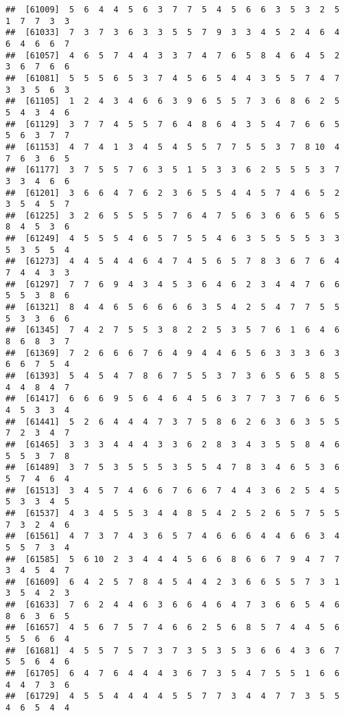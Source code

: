 \documentclass[
]{book}
\begin{document}
\begin{verbatim}
##  [61009]  5  6  4  4  5  6  3  7  7  5  4  5  6  6  3  5  3  2  5  1  7  7  3  3
##  [61033]  7  3  7  3  6  3  3  5  5  7  9  3  3  4  5  2  4  6  4  6  4  6  6  7
##  [61057]  4  6  5  7  4  4  3  3  7  4  7  6  5  8  4  6  4  5  2  3  6  7  6  6
##  [61081]  5  5  5  6  5  3  7  4  5  6  5  4  4  3  5  5  7  4  7  3  3  5  6  3
##  [61105]  1  2  4  3  4  6  6  3  9  6  5  5  7  3  6  8  6  2  5  5  4  3  4  6
##  [61129]  3  7  7  4  5  5  7  6  4  8  6  4  3  5  4  7  6  6  5  5  6  3  7  7
##  [61153]  4  7  4  1  3  4  5  4  5  5  7  7  5  5  3  7  8 10  4  7  6  3  6  5
##  [61177]  3  7  5  5  7  6  3  5  1  5  3  3  6  2  5  5  5  3  7  3  3  4  6  6
##  [61201]  3  6  6  4  7  6  2  3  6  5  5  4  4  5  7  4  6  5  2  3  5  4  5  7
##  [61225]  3  2  6  5  5  5  5  7  6  4  7  5  6  3  6  6  5  6  5  8  4  5  3  6
##  [61249]  4  5  5  5  4  6  5  7  5  5  4  6  3  5  5  5  5  3  3  5  3  5  5  4
##  [61273]  4  4  5  4  4  6  4  7  4  5  6  5  7  8  3  6  7  6  4  7  4  4  3  3
##  [61297]  7  7  6  9  4  3  4  5  3  6  4  6  2  3  4  4  7  6  6  5  5  3  8  6
##  [61321]  8  4  4  6  5  6  6  6  6  3  5  4  2  5  4  7  7  5  5  5  3  3  6  6
##  [61345]  7  4  2  7  5  5  3  8  2  2  5  3  5  7  6  1  6  4  6  8  6  8  3  7
##  [61369]  7  2  6  6  6  7  6  4  9  4  4  6  5  6  3  3  3  6  3  6  6  7  5  4
##  [61393]  5  4  5  4  7  8  6  7  5  5  3  7  3  6  5  6  5  8  5  4  4  8  4  7
##  [61417]  6  6  6  9  5  6  4  6  4  5  6  3  7  7  3  7  6  6  5  4  5  3  3  4
##  [61441]  5  2  6  4  4  4  7  3  7  5  8  6  2  6  3  6  3  5  5  7  2  3  4  7
##  [61465]  3  3  3  4  4  4  3  3  6  2  8  3  4  3  5  5  8  4  6  5  5  3  7  8
##  [61489]  3  7  5  3  5  5  5  3  5  5  4  7  8  3  4  6  5  3  6  5  7  4  6  4
##  [61513]  3  4  5  7  4  6  6  7  6  6  7  4  4  3  6  2  5  4  5  5  3  3  4  5
##  [61537]  4  3  4  5  5  3  4  4  8  5  4  2  5  2  6  5  7  5  5  7  3  2  4  6
##  [61561]  4  7  3  7  4  3  6  5  7  4  6  6  6  4  4  6  6  3  4  5  5  7  3  4
##  [61585]  5  6 10  2  3  4  4  4  5  6  6  8  6  6  7  9  4  7  7  3  4  5  4  7
##  [61609]  6  4  2  5  7  8  4  5  4  4  2  3  6  6  5  5  7  3  1  3  5  4  2  3
##  [61633]  7  6  2  4  4  6  3  6  6  4  6  4  7  3  6  6  5  4  6  8  6  3  6  5
##  [61657]  4  5  6  7  5  7  4  6  6  2  5  6  8  5  7  4  4  5  6  5  5  6  6  4
##  [61681]  4  5  5  7  5  7  3  7  3  5  3  5  3  6  6  4  3  6  7  5  5  6  4  6
##  [61705]  6  4  7  6  4  4  4  3  6  7  3  5  4  7  5  5  1  6  6  4  4  7  3  6
##  [61729]  4  5  5  4  4  4  4  5  5  7  7  3  4  4  7  7  3  5  5  4  6  5  4  4

\end{verbatim}
\end{document}
